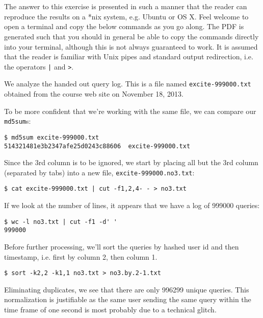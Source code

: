 
\section{}

\label{appendix:1}

The answer to this exercise is presented in such a manner that the reader can
reproduce the results on a *nix system, e.g. Ubuntu or OS X. Feel welcome to
open a terminal and copy the below commands as you go along. The PDF is
generated such that you should in general be able to copy the commands directly
into your terminal, although this is not always guaranteed to work. It is
assumed that the reader is familiar with Unix pipes and standard output
redirection, i.e. the operators \texttt{|} and \texttt{>}.

We analyze the handed out query log. This is a file named
\texttt{excite-999000.txt} obtained from the course web site on November 18,
2013.

To be more confident that we're working with the same file, we can compare our
\texttt{md5sum}s:

\begin{lstlisting}
$ md5sum excite-999000.txt
514321481e3b2347afe25d0243c88606  excite-999000.txt
\end{lstlisting}

Since the 3rd column is to be ignored, we start by placing all but the 3rd
column (separated by tabs) into a new file, \texttt{excite-999000.no3.txt}:

\begin{lstlisting}
$ cat excite-999000.txt | cut -f1,2,4- - > no3.txt
\end{lstlisting}

If we look at the number of lines, it appears that we have a log of 999000
queries:

\begin{lstlisting}
$ wc -l no3.txt | cut -f1 -d' '
999000
\end{lstlisting}

Before further processing, we'll sort the queries by hashed user id and then
timestamp, i.e. first by column 2, then column 1.

\begin{lstlisting}
$ sort -k2,2 -k1,1 no3.txt > no3.by.2-1.txt
\end{lstlisting}

Eliminating duplicates, we see that there are only 996299 unique queries. This
normalization is justifiable as the same user sending the same query within the
time frame of one second is most probably due to a technical glitch.

